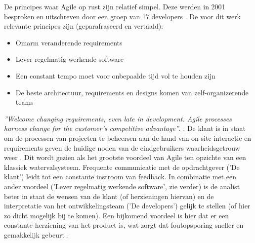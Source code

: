 %
%
%

De principes waar Agile op rust zijn relatief simpel. Deze werden in 2001 besproken en uitschreven door een groep van 17 developers \autocite{Beck2001}. De voor dit werk relevante principes zijn (geparafraseerd en vertaald):
\begin{itemize}
  \item Omarm veranderende requirements
  \item Lever regelmatig werkende software
  \item Een constant tempo moet voor onbepaalde tijd vol te houden zijn
  \item De beste architectuur, requirements en designs komen van zelf-organizerende teams
\end{itemize}



\emph{''Welcome changing requirements, even late in
development. Agile processes harness change for
the customer's competitive advantage''}. \autocite{Beck2001}. De klant is in staat om de processen van projecten te beheersen  aan de hand van on-site interactie en requirements geven de huidige noden van de eindgebruikers waarheidsgetrouw weer \autocite{Kumar2012}. Dit wordt gezien als het grootste voordeel van Agile ten opzichte van een klassiek watervalsysteem. Frequente communicatie met de opdrachtgever ('De klant') leidt tot een constante instroom van feedback. In combinatie met een ander voordeel ('Lever regelmatig werkende software', zie verder) is de analist beter in staat de wensen van de klant (of herzieningen hiervan) en de interpretatie van het ontwikkelingsteam ('De developers') gelijk te stellen (of hier zo dicht mogelijk bij te komen). Een bijkomend voordeel is hier dat er een constante herziening van het product is, wat zorgt dat foutopsporing sneller en gemakkelijk gebeurt \autocite{Imreh2011}.

